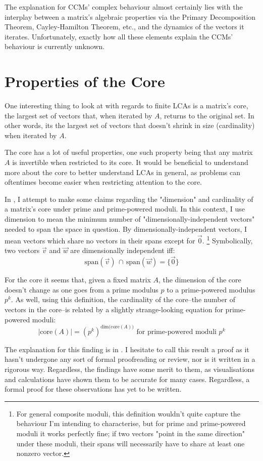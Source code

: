 \documentclass[a4paper, 12pt, reqno]{amsart}
\newcommand{\ssection}[1]{\vspace{1cm}\section{#1}}
\begin{document}
		The explanation for CCMs' complex behaviour almost certainly lies with the interplay between a 
		matrix's algebraic properties via the Primary Decomposition Theorem, Cayley-Hamilton Theorem, 
		etc., and the dynamics of the vectors it iterates. Unfortunately, exactly how all these elements
		explain the CCMs' behaviour is currently unknown.
		
	\ssection{Properties of the Core}
		One interesting thing to look at with regards to finite LCAs is a matrix's core, the largest set of 
		vectors that, when iterated by $A$, returns to the original set. In other words, its the largest set of 
		vectors that doesn't shrink in size (cardinality) when iterated by $A$.
		
		The core has a lot of useful properties, one such property being that any matrix $A$ is invertible
		when restricted to its core. It would be beneficial to understand more about the core to better
		understand LCAs in general, as problems can oftentimes become easier when restricting attention to
		the core.
		
		In \citet{Strong2022core}, I attempt to make some claims regarding the "dimension" and cardinality of
		a matrix's core under prime and prime-powered moduli. In this context, I use dimension to mean the
		minimum number of "dimensionally-independent vectors" needed to span the space in question. By
		dimensionally-independent vectors, I mean vectors which share no vectors in their spans except
		for $\vec{0}$.
		\footnote
		{
			For general composite moduli, this definition wouldn't quite capture the behaviour I'm intending to
			characterise, but for prime and prime-powered moduli it works perfectly fine; if two vectors
			"point in the same direction" under these moduli, their spans will necessarily have to share at
			least one nonzero vector.
		} 
		Symbolically, two vectors $\vec{v}$ and $\vec{w}$ are dimensionally independent iff:
		\[
			\text{span}(\vec{v}) \, \cap \, \text{span}(\vec{w}) = \{\vec{0}\}
		\]
		
		For the core it seems that, given a fixed matrix $A$, the dimension of the core doesn't change 
		as one goes from a prime modulus $p$ to a prime-powered modulus $p^k$. As well, using this 
		definition, the cardinality of the core--the number of vectors in the core--is related by a slightly 
		strange-looking equation for prime-powered moduli:
		\[
			|\text{core}(A)| = (p^k)^{\text{dim(core}(A))} \,\, \text{for prime-powered moduli} \,\, p^k
		\]
		
		The explanation for this finding is in \citet{Strong2022core}. I hesitate to call this result a
		proof as it hasn't undergone any sort of formal proofreading or review, nor is it written in a
		rigorous way. Regardless, the findings have some merit to them, as visualisations and calculations
		have shown them to be accurate for many cases. Regardless, a formal proof for these observations
		has yet to be written.
		
\end{document}
